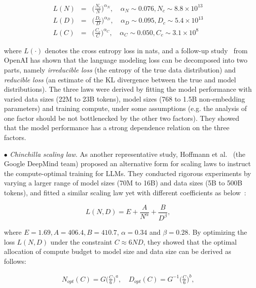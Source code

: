 \begin{small}
\begin{eqnarray}
L(N) &=& \bigg(\frac{N_c}{N}\bigg)^{\alpha_N}, \text{~~~} \alpha_N \sim 0.076, N_c \sim 8.8\times 10^{13} \\\nonumber L(D) &=& \bigg(\frac{D_c
}{D}\bigg)^{\alpha_D},  \text{~~~} \alpha_D \sim 0.095, D_c \sim 5.4\times 10^{13} \\\nonumber L(C) &=& \bigg(\frac{C_c}{C}\bigg)^{\alpha_C},  \text{~~~} \alpha_C \sim 0.050, C_c \sim 3.1\times 10^{8}\nonumber
\end{eqnarray}
\end{small}

 where $L(\cdot)$ denotes  the cross entropy loss in nats, and a follow-up study~\cite{Henighan-2020-scalinglaw} from OpenAI has shown that the language modeling loss can be decomposed into two parts, namely \emph{irreducible loss} (the entropy of the true data distribution) and \emph{reducible loss} (an estimate of the KL divergence between the true and model distributions). The three laws were derived by fitting the model performance with varied data sizes (22M to 23B tokens), model sizes  (768 to 1.5B non-embedding parameters) and training compute, under some assumptions (e.g. the analysis of one factor should be not bottlenecked by the other two factors). They showed that the model performance has a strong dependence relation on the three factors. 

$\bullet$ \emph{Chinchilla scaling law}. As another representative study,  Hoffmann et al.~\cite{Hoffmann-arxiv-2022-Training} (the Google DeepMind team) proposed an alternative form for scaling laws to instruct the compute-optimal training for LLMs. They conducted rigorous  experiments by varying a larger range of model sizes (70M to 16B) and data sizes (5B to 500B tokens), and fitted a similar scaling law yet with different coefficients  as below~\cite{Hoffmann-arxiv-2022-Training}:

\begin{equation}
L(N, D) = E + \frac{A}{N^\alpha} + \frac{B}{D^{\beta}},
\end{equation}

where $E = 1.69, A = 406.4, B = 410.7$, $\alpha=0.34$ and $\beta=0.28$. By optimizing the loss $L(N, D)$ under the constraint $C\approx 6ND$, they showed that  the optimal  allocation of compute budget to model size and data size can be  derived as follows:

\begin{small}
\begin{eqnarray}\label{eq-CSL}
N_{opt}(C)=G \bigg(\frac{C}{6}\bigg)^a, \text{~~~}
D_{opt}(C)=G^{-1} \bigg(\frac{C}{6}\bigg)^b, 
\end{eqnarray}\nonumber
\end{small}

